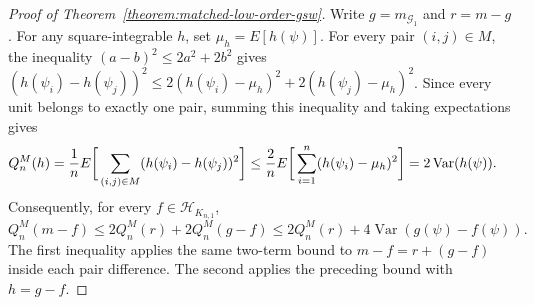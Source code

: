 \documentclass[letterpaper,12pt]{article}
\theoremstyle{definition}
\numberwithin{equation}{section}
\newcommand{\mc}{\mathcal}
\DeclareMathOperator{\var}{Var}
\begin{document}
\begin{proof}[Proof of Theorem~\ref{theorem:matched-low-order-gsw}]
Write $g=m_{\mc G_1}$ and $r=m-g$.
For any square-integrable $h$, set $\mu_h=E[h(\psi)]$.
For every pair $(i,j)\in M$, the inequality $(a-b)^2\leq2a^2+2b^2$ gives $(h(\psi_i)-h(\psi_j))^2\leq2(h(\psi_i)-\mu_h)^2+2(h(\psi_j)-\mu_h)^2$.
Since every unit belongs to exactly one pair, summing this inequality and taking expectations gives
\begin{align}
Q_n^M(h)&=\frac1nE\bigg[\sum_{(i,j)\in M}(h(\psi_i)-h(\psi_j))^2\bigg]\notag \leq\frac2nE\bigg[\sum_{i=1}^n(h(\psi_i)-\mu_h)^2\bigg]=2\var(h(\psi)).
\end{align}
Consequently, for every $f\in\mc H_{K_{n,1}}$,
\begin{equation}\label{equation:proof-pair-energy-split}
Q_n^M(m-f)\leq2Q_n^M(r)+2Q_n^M(g-f)\leq2Q_n^M(r)+4\var(g(\psi)-f(\psi)).
\end{equation}
The first inequality applies the same two-term bound to $m-f=r+(g-f)$ inside each pair difference.
The second applies the preceding bound with $h=g-f$.


\end{proof}
\end{document}
